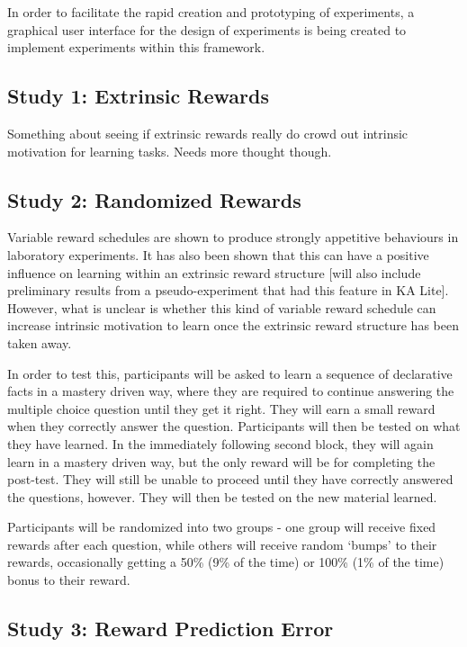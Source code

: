 \documentclass[12pt,a4paper,titlepage]{scrreprt}
\begin{document}
In order to facilitate the rapid creation and prototyping of experiments, a graphical user interface for the design of experiments is being created to implement experiments within this framework. 

\subsection{Study 1: Extrinsic Rewards}

Something about seeing if extrinsic rewards really do crowd out intrinsic motivation for learning tasks. Needs more thought though.

\subsection{Study 2: Randomized Rewards}
Variable reward schedules are shown to produce strongly appetitive behaviours in laboratory experiments. It has also been shown that this can have a positive influence on learning within an extrinsic reward structure [will also include preliminary results from a pseudo-experiment that had this feature in KA Lite]. However, what is unclear is whether this kind of variable reward schedule can increase intrinsic motivation to learn once the extrinsic reward structure has been taken away.

In order to test this, participants will be asked to learn a sequence of declarative facts in a mastery driven way, where they are required to continue answering the multiple choice question until they get it right. They will earn a small reward when they correctly answer the question. Participants will then be tested on what they have learned. In the immediately following second block, they will again learn in a mastery driven way, but the only reward will be for completing the post-test. They will still be unable to proceed until they have correctly answered the questions, however. They will then be tested on the new material learned.

Participants will be randomized into two groups - one group will receive fixed rewards after each question, while others will receive random `bumps' to their rewards, occasionally getting a 50\% (9\% of the time) or 100\% (1\% of the time) bonus to their reward.

\subsection{Study 3: Reward Prediction Error}
\end{document}
